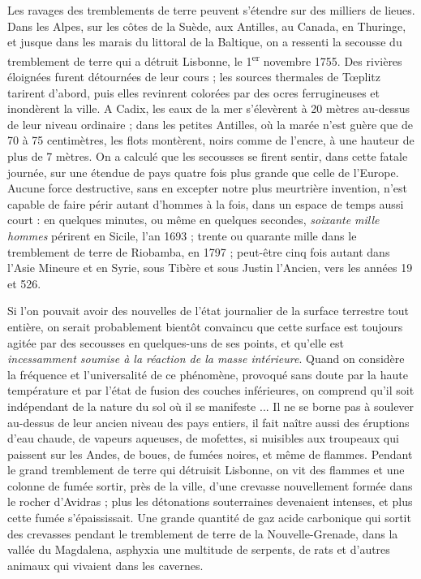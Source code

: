 \documentclass[a4paper, 11pt, oneside]{article}
\begin{document}
Les ravages des tremblements de terre peuvent s'étendre sur des milliers de lieues. Dans les Alpes, sur les côtes de la Suède, aux Antilles, au Canada, en Thuringe, et jusque dans les marais du littoral de la Baltique, on a ressenti la secousse du tremblement de terre qui a détruit Lisbonne, le 1\textsuperscript{er} novembre 1755. Des rivières éloignées furent détournées de leur cours ; les sources thermales de Tœplitz tarirent d'abord, puis elles revinrent colorées par des ocres ferrugineuses et inondèrent la ville. A Cadix, les eaux de la mer s'élevèrent à 20 mètres au-dessus de leur niveau ordinaire ; dans les petites Antilles, où la marée n'est guère que de 70 à 75 centimètres, les flots montèrent, noirs comme de l'encre, à une hauteur de plus de 7 mètres. On a calculé que les secousses se firent sentir, dans cette fatale journée, sur une étendue de pays quatre fois plus grande que celle de l'Europe. Aucune force destructive, sans en excepter notre plus meurtrière invention, n'est capable de faire périr autant d'hommes à la fois, dans un espace de temps aussi court : en quelques minutes, ou même en quelques secondes, \emph{soixante mille hommes} périrent en Sicile, l'an 1693 ; trente ou quarante mille dans le tremblement de terre de Riobamba, en 1797 ; peut-être cinq fois autant dans l'Asie Mineure et en Syrie, sous Tibère et sous Justin l'Ancien, vers les années 19 et 526.

Si l'on pouvait avoir des nouvelles de l'état journalier de la surface terrestre tout entière, on serait probablement bientôt convaincu que cette surface est toujours agitée par des secousses en quelques-uns de ses points, et qu'elle est \emph{incessamment soumise à la réaction de la masse intérieure}. Quand on considère la fréquence et l'universalité de ce phénomène, provoqué sans doute par la haute température et par l'état de fusion des couches inférieures, on comprend qu'il soit indépendant de la nature du sol où il se manifeste ... Il ne se borne pas à soulever au-dessus de leur ancien niveau des pays entiers, il fait naître aussi des éruptions d'eau chaude, de vapeurs aqueuses, de mofettes, si nuisibles aux troupeaux qui paissent sur les Andes, de boues, de fumées noires, et même de flammes. Pendant le grand tremblement de terre qui détruisit Lisbonne, on vit des flammes et une colonne de fumée sortir, près de la ville, d'une crevasse nouvellement formée dans le rocher d'Avidras ; plus les détonations souterraines devenaient intenses, et plus cette fumée s'épaississait. Une grande quantité de gaz acide carbonique qui sortit des crevasses pendant le tremblement de terre de la Nouvelle-Grenade, dans la vallée du Magdalena, asphyxia une multitude de serpents, de rats et d'autres animaux qui vivaient dans les cavernes.
\end{document}
